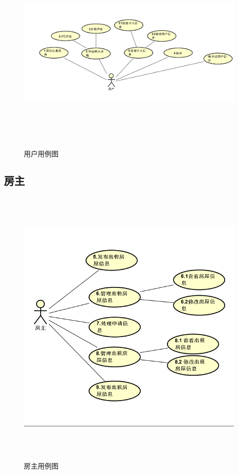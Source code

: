 \begin{figure}[htbp]

    \centering
    
    \includegraphics[height=10.0cm,width=14.0cm]{requirement/figures/yonghu.png} 
    \caption{用户用例图}
    
    \end{figure}
    \newpage
\subsection{房主}

\begin{figure}[htbp]

    \centering
    
    \includegraphics[height=14.0cm,width=14.0cm]{requirement/figures/fangzhu.png} 
    \caption{房主用例图}
    
    \end{figure}
    \newpage

